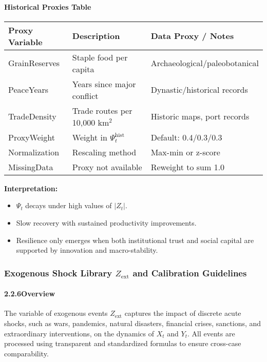 \documentclass[12pt]{report}
\begin{document}
\paragraph{Historical Proxies Table}
\begin{center}
\begin{tabular}{|l|l|l|}
\hline
\textbf{Proxy Variable} & \textbf{Description} & \textbf{Data Proxy / Notes} \\
\hline
GrainReserves & Staple food per capita & Archaeological/paleobotanical \\
PeaceYears & Years since major conflict & Dynastic/historical records \\
TradeDensity & Trade routes per 10,000 km$^2$ & Historic maps, port records \\
ProxyWeight & Weight in $\Psi_t^{\text{hist}}$ & Default: 0.4/0.3/0.3 \\
Normalization & Rescaling method & Max-min or z-score \\
MissingData & Proxy not available & Reweight to sum 1.0 \\
\hline
\end{tabular}
\end{center}

\vspace{0.5em}
\noindent
\textbf{Interpretation:}
\begin{itemize}
  \item $\Psi_t$ decays under high values of $|Z_t|$.
  \item Slow recovery with sustained productivity improvements.
  \item Resilience only emerges when both institutional trust and social capital are supported by innovation and macro-stability.
\end{itemize}

\subsubsection{Exogenous Shock Library $Z_{\text{ext}}$ and Calibration Guidelines}

\paragraph{2.2.6\quad Overview}

The variable of exogenous events $Z_{\text{ext}}$ captures the impact of discrete acute shocks, such as wars, pandemics, natural disasters, financial crises, sanctions, and extraordinary interventions, on the dynamics of $X_t$ and $Y_t$. All events are processed using transparent and standardized formulas to ensure cross-case comparability.
\end{document}

